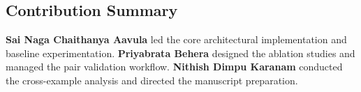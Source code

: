 \documentclass[11pt]{article}
\begin{document}
\subsection{Contribution Summary}
\label{app:contributions}

\textbf{Sai Naga Chaithanya Aavula} led the core architectural implementation and baseline experimentation. \textbf{Priyabrata Behera} designed the ablation studies and managed the pair validation workflow. \textbf{Nithish Dimpu Karanam} conducted the cross-example analysis and directed the manuscript preparation.
\end{document}
